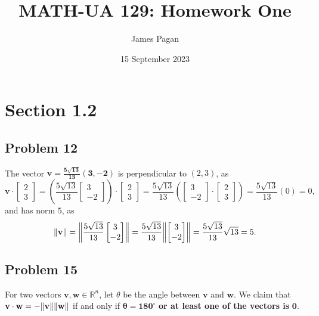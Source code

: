 \documentclass[11pt]{article}
\title{MATH-UA 129: Homework One}
\author{James Pagan}
\date{15 September 2023}
\renewcommand{\vec}[1]{\mathbf{#1}}
\begin{document}
\maketitle
\tableofcontents



\section{Section 1.2}

\subsection*{Problem 12}

The vector $\mathbf{\vec{v} = \tfrac{5\sqrt{13}}{13} (3, -2)}$ is perpendicular to $(2, 3)$, as 
\[ 
	\vec{v} \cdot \begin{bmatrix} 2 \\ 3 \end{bmatrix} = \left( \frac{5\sqrt{13}}{13} \begin{bmatrix} 3 \\ -2 \end{bmatrix} \right) \cdot \begin{bmatrix} 2 \\ 3 \end{bmatrix} = \frac{5\sqrt{13}}{13} \left( \begin{bmatrix} 3 \\ -2 \end{bmatrix} \cdot \begin{bmatrix} 2 \\ 3 \end{bmatrix} \right) =  \frac{5\sqrt{13}}{13} (0) = 0,
\]
and has norm $5$, as 
\[ 
\norm{\vec{v}} = \norm{\frac{5\sqrt{13}}{13} \begin{bmatrix} 3 \\ -2 \end{bmatrix}} = \frac{5\sqrt{13}}{13} \norm{\begin{bmatrix} 3 \\ -2 \end{bmatrix}} = \frac{5\sqrt{13}}{13} \sqrt{13} = 5. 
\]

\newpage

\subsection*{Problem 15}

For two vectors $\vec{v}, \vec{w} \in \mathbb{R}^{n}$, let $\theta$ be the angle between $\vec{v}$ and $\vec{w}$. We claim that $\vec{v} \cdot \vec{w} = -\norm{\vec{v}}\norm{\vec{w}}$ if and only if $\mathbf{\theta = 180^{\circ}}$ \textbf{or at least one of the vectors is} $\mathbf{\vec{0}}$.
\end{document}
